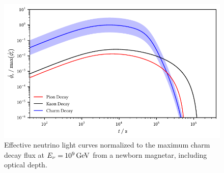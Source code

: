 \begin{figure}[H]
	\centering
	\includegraphics{../plots/build/magnetar_neutrino_spectrum_with.pdf}
	\caption[Magnetar $\nu \kern+0.5pt$ flux compared to $c$ decay with optical depth.]
			{Effective neutrino light curves normalized to the maximum charm decay flux at
			 $E_\nu = \kern-0.5pt \qty{e9}{\giga\electronvolt}$ from a newborn magnetar, including optical depth.}
	\label{fig:magnetar-flux-with}
\end{figure}
